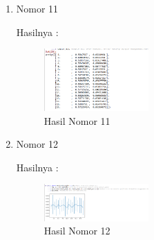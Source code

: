 \begin{enumerate}
\item Nomor 11
\hfill\break
	
Hasilnya :
\begin{figure}[H]
		\includegraphics[width=4cm]{figures/1174073/2/11.png}
		\centering
		\caption{Hasil Nomor 11}
\end{figure}

\item Nomor 12
\hfill\break
	
Hasilnya :
\begin{figure}[H]
		\includegraphics[width=4cm]{figures/1174073/2/12.png}
		\centering
		\caption{Hasil Nomor 12}
\end{figure}
\end{enumerate}
